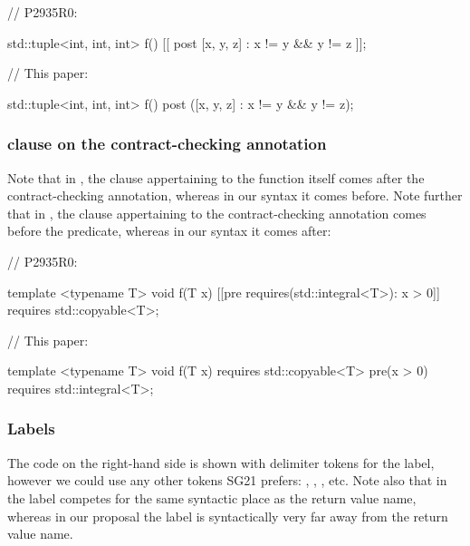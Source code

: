 \begin{minipage}{8cm}
\begin{codeblock}
// P2935R0:

std::tuple<int, int, int> f()
  [[ post [x, y, z] : x != y && y != z ]];
\end{codeblock}
\end{minipage}
\begin{minipage}{8cm}
\begin{codeblock}
// This paper:

std::tuple<int, int, int> f()
  post ([x, y, z] : x != y && y != z);
\end{codeblock}
\end{minipage}

\subsubsection{ clause on the contract-checking annotation}

Note that in \cite{P2935R0}, the  clause appertaining to the function itself comes after the contract-checking annotation, whereas in our syntax it comes before. Note further that in \cite{P2935R0}, the  clause appertaining to the contract-checking annotation comes before the predicate, whereas in our syntax it comes after:
\\

\begin{minipage}{8cm}
\begin{codeblock}
// P2935R0:

  template <typename T>
  void f(T x)
    [[pre requires(std::integral<T>): x > 0]]
    requires std::copyable<T>;
\end{codeblock}
\end{minipage}
\begin{minipage}{8cm}
\begin{codeblock}
// This paper:

  template <typename T>
  void f(T x)
    requires std::copyable<T>
    pre(x > 0) requires std::integral<T>;
\end{codeblock}
\end{minipage}

\subsubsection{Labels}

The code on the right-hand side is shown with delimiter tokens \tcode{[...]} for the label, however we could use any other tokens SG21 prefers: , \tcode{[[...]]}, , etc. Note also that in \cite{P2935R0} the label competes for the same syntactic place as the return value name, whereas in our proposal the label is syntactically very far away from the return value name.
\\


